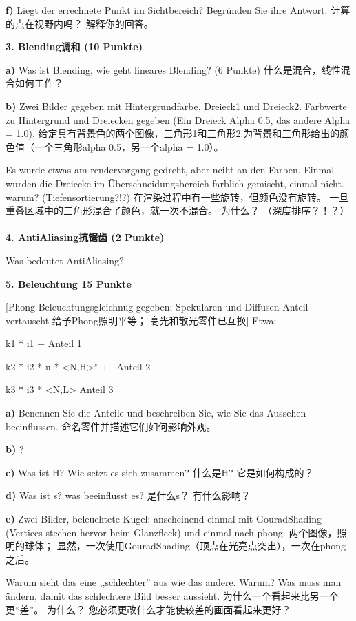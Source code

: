 \documentclass[fleqn]{article}
\begin{document}
\indent\textbf{f)} Liegt der errechnete Punkt im Sichtbereich? Begründen Sie ihre Antwort. 计算的点在视野内吗？ 解释你的回答。

\noindent\textbf{3. Blending调和 (10 Punkte)}

\indent\textbf{a)} Was ist Blending, wie geht lineares Blending? (6 Punkte) 什么是混合，线性混合如何工作？

\indent\textbf{b)} Zwei Bilder gegeben mit Hintergrundfarbe, Dreieck1 und Dreieck2. Farbwerte zu Hintergrund und Dreiecken gegeben (Ein Dreieck Alpha 0.5, das andere Alpha = 1.0).
给定具有背景色的两个图像，三角形1和三角形2.为背景和三角形给出的颜色值（一个三角形alpha 0.5，另一个alpha = 1.0）。

Es wurde etwas am rendervorgang gedreht, aber nciht an den Farben. Einmal wurden die Dreiecke im Überschneidungsbereich farblich gemischt, einmal nicht.  warum? (Tiefensortierung?!?)
在渲染过程中有一些旋转，但颜色没有旋转。 一旦重叠区域中的三角形混合了颜色，就一次不混合。 为什么？ （深度排序？！？）
\\
\\
\noindent\textbf{4. AntiAliasing抗锯齿 (2 Punkte)}

Was bedeutet AntiAliasing?

\noindent\textbf{5. Beleuchtung 15 Punkte}

[Phong Beleuchtungsgleichnug gegeben; Spekularen und Diffusen Anteil vertauscht 给予Phong照明平等； 高光和散光零件已互换] Etwa:

k1 * i1 + \qquad\qquad\qquad\quad Anteil 1

k2 * i2 * u * <N,H>$^s$ + \, Anteil 2

k3 * i3 * <N,L> \qquad\qquad Anteil 3

\indent\textbf{a)} Benennen Sie die Anteile und beschreiben Sie, wie Sie das Aussehen beeinflussen. 命名零件并描述它们如何影响外观。

\indent\textbf{b)} ?

\indent\textbf{c)} Was ist H? Wie setzt es sich zusammen? 什么是H? 它是如何构成的？

\indent\textbf{d)} Was ist s? was beeinflusst es? 是什么s？ 有什么影响？

\indent\textbf{e)} Zwei Bilder, beleuchtete Kugel; anscheinend einmal mit GouradShading (Vertices stechen hervor beim Glanzfleck) und einmal nach phong. 两个图像，照明的球体； 显然，一次使用GouradShading（顶点在光亮点突出），一次在phong之后。

Warum sieht das eine ,,schlechter'' aus wie das andere. Warum? Was muss man ändern, damit das schlechtere Bild besser aussieht. 为什么一个看起来比另一个更“差”。 为什么？ 您必须更改什么才能使较差的画面看起来更好？
\end{document}
